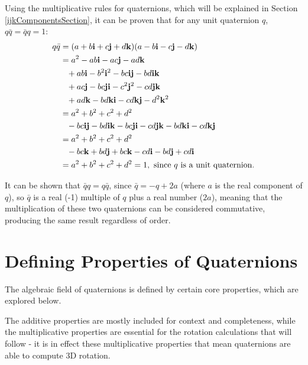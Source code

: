 \documentclass[10pt]{article}
\begin{document}
Using the multiplicative rules for quaternions, which will be explained in Section \ref{ijkComponentsSection}, it can be proven that for any unit quaternion $q$, $q\bar{q} = \bar{q}q = 1$:
\begin{equation}
    \begin{aligned}
        q\bar{q} &= (a + b\vb{i} + c\vb{j} + d\vb{k})(a - b\vb{i} - c\vb{j} - d\vb{k}) \\
                 &= a^2 - ab\vb{i} - ac\vb{j} - ad\vb{k} \\
                 &\phantom{= } + ab\vb{i} - b^2\vb{i}^2 - bc\vb{ij} - bd\vb{ik} \\
                 &\phantom{= } + ac\vb{j} - bc\vb{ji} - c^2\vb{j}^2 -cd\vb{jk} \\
                 &\phantom{= } + ad\vb{k} - bd\vb{ki} - cd\vb{kj} - d^2\vb{k}^2 \\
                 &= a^2 + b^2 + c^2 + d^2 \\
                 &\phantom{= } - bc\vb{ij} - bd\vb{ik} - bc\vb{ji} - cd\vb{jk} - bd\vb{ki} - cd\vb{kj} \\
                 &= a^2 + b^2 + c^2 + d^2 \\
                 &\phantom{= } - bc\vb{k} + bd\vb{j} + bc\vb{k} - cd\vb{i} - bd\vb{j} + cd\vb{i} \\
                 &= a^2 + b^2 + c^2 + d^2 = 1, \text{ since $q$ is a unit quaternion}.
    \end{aligned}
\end{equation}

It can be shown that $\bar{q}q = q\bar{q}$, since $\bar{q} = -q + 2a$ (where $a$ is the real component of $q$), so $\bar{q}$ is a real (-1) multiple of $q$ plus a real number ($2a$), meaning that the multiplication of these two quaternions can be considered commutative, producing the same result regardless of order.

\section{Defining Properties of Quaternions}

The algebraic field of quaternions is defined by certain core properties, which are explored below.

The additive properties are mostly included for context and completeness, while the multiplicative properties are essential for the rotation calculations that will follow - it is in effect these multiplicative properties that mean quaternions are able to compute 3D rotation.
\end{document}
